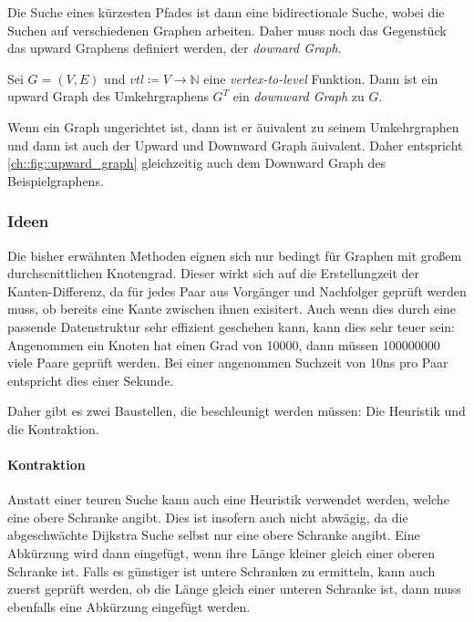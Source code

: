 Die Suche eines kürzesten Pfades ist dann eine bidirectionale Suche, wobei die Suchen auf verschiedenen Graphen arbeiten.
Daher muss noch das Gegenstück das upward Graphens definiert werden, der \emph{downard Graph}.

\begin{definition}
    Sei $G = (V, E)$ und ${vtl} \coloneq V \to \mathbb{N}$ eine \emph{vertex-to-level} Funktion. Dann ist ein upward Graph des Umkehrgraphens $G^T$ ein \emph{downward Graph} zu $G$.
\end{definition}

Wenn ein Graph ungerichtet ist, dann ist er äuivalent zu seinem Umkehrgraphen und dann ist auch der Upward und Downward Graph äuivalent.
Daher entspricht \autoref{ch::fig::upward_graph} gleichzeitig auch dem Downward Graph des Beispielgraphens.


\subsubsection{Ideen}

Die bisher erwähnten Methoden eignen sich nur bedingt für Graphen mit großem durchscnittlichen Knotengrad.
Dieser wirkt sich auf die Erstellungzeit der Kanten-Differenz, da für jedes Paar aus Vorgänger und Nachfolger geprüft werden muss, ob bereits eine Kante zwischen ihnen exisitert.
Auch wenn dies durch eine passende Datenstruktur sehr effizient geschehen kann, kann dies sehr teuer sein:
Angenommen ein Knoten hat einen Grad von \num{10000}, dann müssen \num{100000000} viele Paare geprüft werden.
Bei einer angenommen Suchzeit von \num{10}\unit{\ns} pro Paar entspricht dies einer Sekunde.


Daher gibt es zwei Baustellen, die beschleunigt werden müssen:
Die Heuristik und die Kontraktion.

\paragraph{Kontraktion}
Anstatt einer teuren Suche kann auch eine Heuristik verwendet werden, welche eine obere Schranke angibt.
Dies ist insofern auch nicht abwägig, da die abgeschwächte Dijkstra Suche selbst nur eine obere Schranke angibt.
Eine Abkürzung wird dann eingefügt, wenn ihre Länge kleiner gleich einer oberen Schranke ist.
Falls es günstiger ist untere Schranken zu ermitteln, kann auch zuerst geprüft werden, ob die Länge gleich einer unteren Schranke ist, dann muss ebenfalls eine Abkürzung eingefügt werden.

